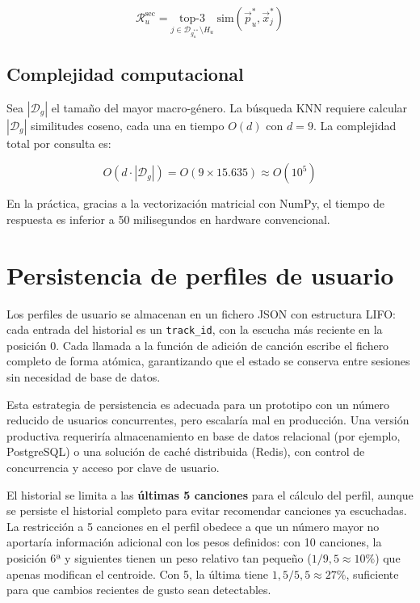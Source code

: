 \documentclass[12pt, a4paper]{book}
\theoremstyle{definition}
\begin{document}
\begin{equation}
\label{eq:rec_sec}
\mathcal{R}_u^{\text{sec}} = \underset{j \in \mathcal{D}_{g_u^{**}}
    \setminus H_u}{\text{top-}3}
    \; \text{sim}(\vec{p}_u^*, \vec{x}_j^*)
\end{equation}

\subsection{Complejidad computacional}

Sea $|\mathcal{D}_g|$ el tamaño del mayor macro-género. La búsqueda KNN
requiere calcular $|\mathcal{D}_g|$ similitudes coseno, cada una en tiempo
$O(d)$ con $d = 9$. La complejidad total por consulta es:

\begin{equation}
O(d \cdot |\mathcal{D}_g|) = O(9 \times 15.635) \approx O(10^5)
\end{equation}

En la práctica, gracias a la vectorización matricial con NumPy, el tiempo
de respuesta es inferior a 50 milisegundos en hardware convencional.

\section{Persistencia de perfiles de usuario}
\label{sec:persistencia}

Los perfiles de usuario se almacenan en un fichero JSON con estructura LIFO:
cada entrada del historial es un \texttt{track\_id}, con la escucha más
reciente en la posición 0. Cada llamada a la función de adición de canción
escribe el fichero completo de forma atómica, garantizando que el estado
se conserva entre sesiones sin necesidad de base de datos.

Esta estrategia de persistencia es adecuada para un prototipo con un número
reducido de usuarios concurrentes, pero escalaría mal en producción. Una
versión productiva requeriría almacenamiento en base de datos relacional
(por ejemplo, PostgreSQL) o una solución de caché distribuida (Redis),
con control de concurrencia y acceso por clave de usuario.

El historial se limita a las \textbf{últimas 5 canciones} para el cálculo
del perfil, aunque se persiste el historial completo para evitar recomendar
canciones ya escuchadas. La restricción a 5 canciones en el perfil obedece
a que un número mayor no aportaría información adicional con los pesos
definidos: con 10 canciones, la posición 6ª y siguientes tienen un peso
relativo tan pequeño ($1/9{,}5 \approx 10\%$) que apenas modifican el
centroide. Con 5, la última tiene $1{,}5/5{,}5 \approx 27\%$, suficiente
para que cambios recientes de gusto sean detectables.
\end{document}
